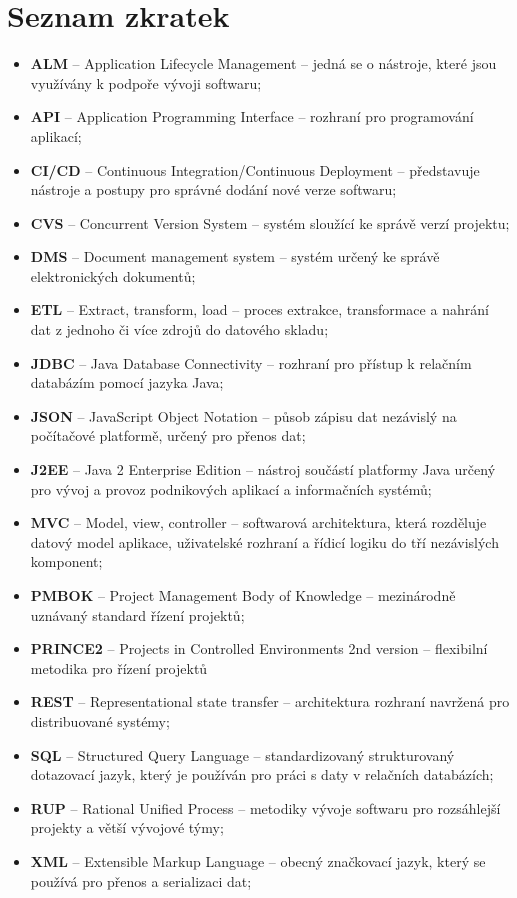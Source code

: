 \documentclass[czech,DP]{thesiskiv}
\begin{document}
\chapter*{Seznam zkratek}
\begin{itemize}
    \item \textbf{ALM} -- Application Lifecycle Management -- jedná se o nástroje, které jsou využívány k podpoře vývoji softwaru;
    \item \textbf{API} -- Application Programming Interface -- rozhraní pro programování aplikací;
    \item \textbf{CI/CD} -- Continuous Integration/Continuous Deployment -- představuje nástroje a postupy pro správné dodání nové verze softwaru;
    \item \textbf{CVS} -- Concurrent Version System -- systém sloužící ke správě verzí projektu;
    \item \textbf{DMS} -- Document management system -- systém určený ke správě elektronických dokumentů;
    \item \textbf{ETL} -- Extract, transform, load -- proces extrakce, transformace a nahrání dat z jednoho či více zdrojů do datového skladu;
    \item \textbf{JDBC} -- Java Database Connectivity -- rozhraní pro přístup k relačním databázím pomocí jazyka Java;
    \item \textbf{JSON} -- JavaScript Object Notation -- působ zápisu dat nezávislý na počítačové platformě, určený pro přenos dat;
    \item \textbf{J2EE} -- Java 2 Enterprise Edition -- nástroj součástí platformy Java určený pro vývoj a provoz podnikových aplikací a informačních systémů;
    \item \textbf{MVC} -- Model, view, controller -- softwarová architektura, která rozděluje datový model aplikace, uživatelské rozhraní a řídicí logiku do tří nezávislých komponent;
    \item \textbf{PMBOK} -- Project Management Body of Knowledge -- mezinárodně uznávaný standard řízení projektů;
    \item \textbf{PRINCE2} -- Projects in Controlled Environments 2nd version --  flexibilní metodika pro řízení projektů
    \item \textbf{REST} -- Representational state transfer -- architektura rozhraní navržená pro distribuované systémy;
    \item \textbf{SQL} -- Structured Query Language -- standardizovaný strukturovaný dotazovací jazyk, který je používán pro práci s daty v relačních databázích;
    \item \textbf{RUP} -- Rational Unified Process -- metodiky vývoje softwaru pro rozsáhlejší projekty a větší vývojové týmy;
    \item \textbf{XML} -- Extensible Markup Language -- obecný značkovací jazyk, který se používá pro přenos a serializaci dat;
\end{itemize}
\listoffigures
{}
\listoftables
\appendix 
\end{document}
